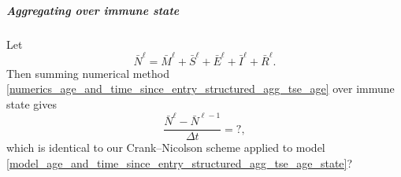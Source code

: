 \documentclass{jpmarticle}
\begin{document}
\subparagraph{Aggregating over immune state}

Let
\begin{equation}
  \bar{N}^{\ell}
  = \bar{M}^{\ell} + \bar{S}^{\ell} + \bar{E}^{\ell}
  + \bar{I}^{\ell} + \bar{R}^{\ell}.
\end{equation}
Then summing numerical method
\eqref{numerics_age_and_time_since_entry_structured_agg_tse_age} over
immune state gives
\begin{equation}
  \label{numerics_age_and_time_since_entry_structured_agg_tse_age_state}
  \frac{\bar{N}^{\ell} - \bar{N}^{\ell - 1}}{\Delta t}
  = ?,
\end{equation}
which is identical to our Crank--Nicolson scheme applied to model
\eqref{model_age_and_time_since_entry_structured_agg_tse_age_state}?


\printbibliography
\end{document}
